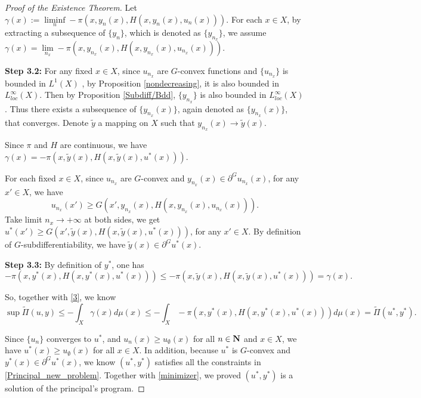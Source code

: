 \begin{proof}[Proof of the Existence Theorem]
	Let $\gamma(x):=\liminf\limits_{n} - \pi(x, y_n(x), H(x,y_n(x),u_n(x)))$. 
 For each $x\in X$, by extracting a subsequence of $\{y_{n} \}$, which is denoted as $\{y_{n_x}\}$, we assume $\gamma(x) = \lim\limits_{n_x} - \pi(x, y_{n_x}(x), H(x,y_{n_x}(x),u_{n_x}(x)))$. \medskip
	
	{\bf Step 3.2: } For any fixed $x \in X$, since $u_{n_x}$ are $G$-convex functions and $\{u_{n_x}\}$ is bounded in $L^1(X)$%
	, by Proposition \ref{nondecreasing}, it is also bounded in $L_{loc}^{\infty}(X)$. 	Then by Proposition \ref{Subdiff/Bdd}, $\{y_{n_x}\}$ is also bounded in $L_{loc}^{\infty}(X)$ . Thus there exists a subsequence of $\{y_{n_x}(x)\}$, again denoted as $\{y_{n_x}(x)\}$, that converges. Denote $\tilde{y}$ a mapping on $X$ such that $y_{n_x}(x) \rightarrow \tilde{y}(x)$.
	
	Since $\pi$ and $H$ are continuous, we have $ \gamma(x)= - \pi(x, \tilde{y}(x), H(x,\tilde{y}(x),u^*(x)))$.
	
	For each fixed $x\in X$, since $u_{n_x}$ are $G$-convex and $y_{n_x}(x) \in \partial^G u_{n_x}(x)$, for any $x' \in X$, we have $$u_{n_x}(x')\ge G(x', y_{n_x}(x),H(x,y_{n_x}(x),u_{n_x}(x))).$$ 
	Take limit $n_x \rightarrow +\infty$ at both sides, we get $u^*(x')\ge G(x', \tilde{y}(x),H(x,\tilde{y}(x),u^*(x)))$, for any $x'\in X$. By definition of $G$-subdifferentiability, we have $\tilde{y}(x)\in \partial^Gu^*(x)$. \medskip


	{\bf Step 3.3: } By definition of $y^*$, one has $$ -\pi(x, y^*(x), H(x,y^*(x),u^*(x)))\le   -\pi(x, \tilde{y}(x), H(x,\tilde{y}(x),u^*(x))) = \gamma(x).$$
	
	So, together with \eqref{3}, we know 
	\begin{equation}\label{minimizer}
	\sup \tilde{\Pi}(u,y) \le - \int_{X}  \gamma(x) d\mu(x) \le - \int_{X}  - \pi(x, y^*(x), H(x,y^*(x),u^*(x))) d\mu(x) = \tilde{\Pi}(u^*,y^*).
	\end{equation}
	
	
	Since $\{u_n\}$ converges to $u^*$, and $u_n(x)\ge u_{\emptyset}(x)$ for all $n\in \mathbf{N}$ and $x \in X$, we have $u^*(x)\ge u_{\emptyset}(x)$ for all $x \in X$. In addition, because $u^*$ is $G$-convex and $y^*(x) \in \partial^G u^*(x)$, we know $(u^*, y^*)$ satisfies all the constraints in \eqref{Principal_new_problem}. Together with \eqref{minimizer}, we proved $(u^*,y^*)$ is a solution of the principal's program.
\end{proof}



